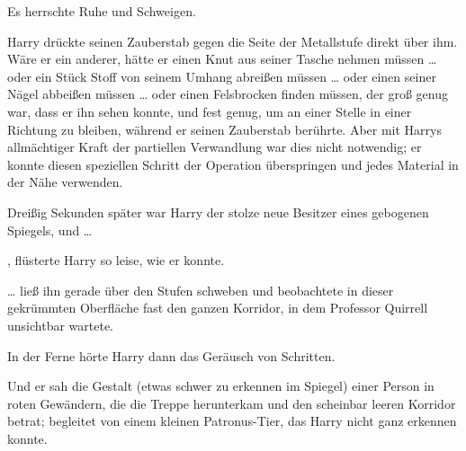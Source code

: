 Es herrschte Ruhe und Schweigen.

Harry drückte seinen Zauberstab gegen die Seite der Metallstufe direkt über ihm. Wäre er ein anderer, hätte er einen Knut aus seiner Tasche nehmen müssen … oder ein Stück Stoff von seinem Umhang abreißen müssen … oder einen seiner Nägel abbeißen müssen … oder einen Felsbrocken finden müssen, der groß genug war, dass er ihn sehen konnte, und fest genug, um an einer Stelle in einer Richtung zu bleiben, während er seinen Zauberstab berührte. Aber mit Harrys allmächtiger Kraft der partiellen Verwandlung war dies nicht notwendig; er konnte diesen speziellen Schritt der Operation überspringen und jedes Material in der Nähe verwenden.

Dreißig Sekunden später war Harry der stolze neue Besitzer eines gebogenen Spiegels, und …

, flüsterte Harry so leise, wie er konnte.

… ließ ihn gerade über den Stufen schweben und beobachtete in dieser gekrümmten Oberfläche fast den ganzen Korridor, in dem Professor Quirrell unsichtbar wartete.

In der Ferne hörte Harry dann das Geräusch von Schritten.

Und er sah die Gestalt (etwas schwer zu erkennen im Spiegel) einer Person in roten Gewändern, die die Treppe herunterkam und den scheinbar leeren Korridor betrat; begleitet von einem kleinen Patronus-Tier, das Harry nicht ganz erkennen konnte.

